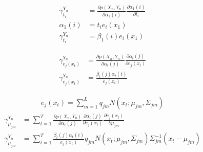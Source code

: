 \begin{align*}
\gamma_{t_i}^{Y_n} &= \frac{\partial p(X_n, Y_n)}{\partial \alpha_1(i)}\frac{\partial \alpha_1(i)}{\partial t_i} \\
\alpha_1(i) &= t_ie_i(x_1)\\
\gamma_{t_i}^{Y_n} &= \beta_1(i)e_i(x_1)
\end{align*} 

\begin{align*}
\gamma_{e_j(x_t)}^{Y_n} &= \frac{\partial p(X_n, Y_n)}{\partial \alpha_t(j)}\frac{\partial \alpha_t(j)}{\partial e_j(x_t)} \\
\gamma_{e_j(x_t)}^{Y_n} &= \frac{\beta_t(j)\alpha_t(i)}{e_j(x_t)}
\end{align*} 

\begin{align}
e_j(x_t) = \sum_{m=1}^{L}q_{jm}N(x_t; \mu_{jm}, \Sigma_{jm})
\end{align}
\begin{align*}
\gamma_{\mu_{jm}}^{Y_n} &= \sum_{t = 1}^T \frac{\partial p(X_n, Y_n)}{\partial \alpha_t(j)}\frac{\partial \alpha_t(j)}{\partial e_j(x_t)}\frac{\partial e_j(x_t)}{\partial \mu_{jm}} \\
\gamma_{\mu_{jm}}^{Y_n} &= \sum_{t = 1}^T\frac{\beta_t(j)\alpha_{t}(i)}{e_j(x_t)}q_{jm}N(x_t; \mu_{jm}, \Sigma_{jm})\Sigma_{jm}^{-1}(x_t - \mu_{jm})
\end{align*} 